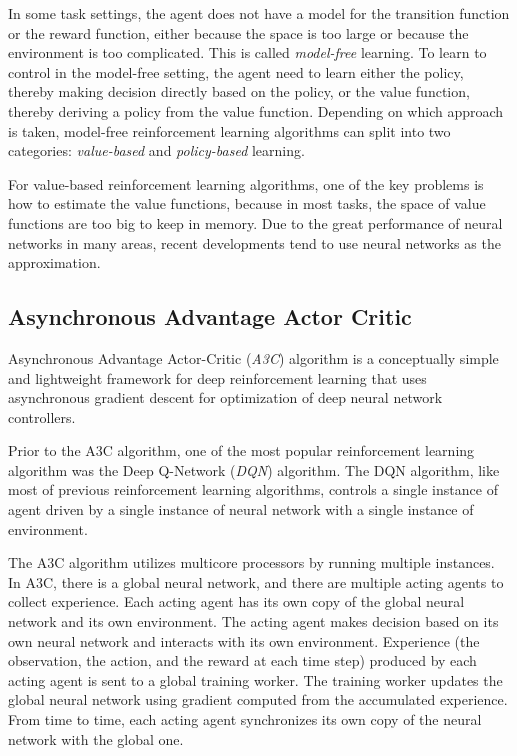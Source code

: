        In some task settings,
        the agent does not have a model for the transition function or the reward function,
        either because the space is too large or because the environment is too complicated.
        This is called \emph{model-free} learning.
        To learn to control in the model-free setting, the agent need to learn either
        the policy, thereby making decision directly based on the policy,
        or the value function, thereby deriving a policy from the value function.
        Depending on which approach is taken,
        model-free reinforcement learning algorithms can split into two categories:
        \emph{value-based} and \emph{policy-based} learning.

        For value-based reinforcement learning algorithms,
        one of the key problems is how to estimate the value functions,
        because in most tasks, the space of value functions are too big to keep in memory.
        Due to the great performance of neural networks in many areas,
        recent developments tend to use neural networks as the approximation.


    \subsection{Asynchronous Advantage Actor Critic}

        Asynchronous Advantage Actor-Critic \cite{mnih_asynchronous_2016} (\emph{A3C}) algorithm is
        a conceptually simple and lightweight framework for deep reinforcement learning
        that uses asynchronous gradient descent for optimization of deep neural network controllers.

        Prior to the A3C algorithm, one of the most popular reinforcement learning algorithm was
        the Deep Q-Network (\emph{DQN}) algorithm. \cite{mnih_human-level_2015}
        The DQN algorithm, like most of previous reinforcement learning algorithms,
        controls a single instance of agent driven by a single instance of neural network
        with a single instance of environment.

        The A3C algorithm utilizes multicore processors by running multiple instances.
        In A3C, there is a global neural network,
        and there are multiple acting agents to collect experience.
        Each acting agent has its own copy of the global neural network and its own environment.
        The acting agent makes decision based on its own neural network and interacts with its own environment.
        Experience (the observation, the action, and the reward at each time step) produced by each acting agent
        is sent to a global training worker.
        The training worker updates the global neural network using gradient computed from the accumulated experience.
        From time to time, each acting agent synchronizes its own copy of the neural network with the global one.

